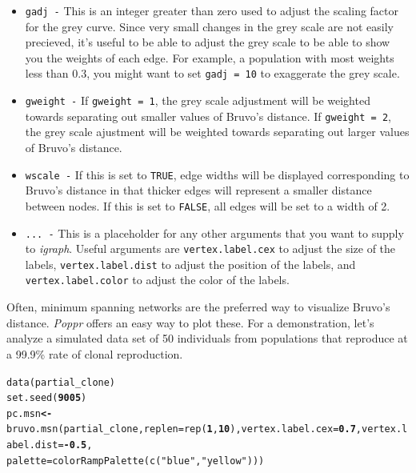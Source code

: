 \documentclass[letterpaper]{article}\usepackage[]{graphicx}\usepackage[]{color}
\makeatletter
\newcommand{\hlnum}[1]{\textcolor[rgb]{0.502,0,0.502}{\textbf{#1}}}%
\newcommand{\hlstr}[1]{\textcolor[rgb]{0.651,0.522,0}{#1}}%
\newcommand{\hlopt}[1]{\textcolor[rgb]{1,0,0.502}{\textbf{#1}}}%
\newcommand{\hlstd}[1]{\textcolor[rgb]{0,0,0}{#1}}%
\newcommand{\hlkwb}[1]{\textcolor[rgb]{0.502,0.502,0.753}{\textbf{#1}}}%
\newcommand{\hlkwc}[1]{\textcolor[rgb]{0,0.502,0.753}{#1}}%
\newcommand{\hlkwd}[1]{\textcolor[rgb]{0,0.267,0.4}{#1}}%
\newenvironment{kframe}{%
 \def\at@end@of@kframe{}%
 \ifinner\ifhmode%
  \def\at@end@of@kframe{\end{minipage}}%
  \begin{minipage}{\columnwidth}%
 \fi\fi%
 \def\FrameCommand##1{\hskip\@totalleftmargin \hskip-\fboxsep
 \colorbox{shadecolor}{##1}\hskip-\fboxsep
     \hskip-\linewidth \hskip-\@totalleftmargin \hskip\columnwidth}%
 \MakeFramed {\advance\hsize-\width
   \@totalleftmargin\z@ \linewidth\hsize
   \@setminipage}}%
 {\par\unskip\endMakeFramed%
 \at@end@of@kframe}
\newenvironment{knitrout}{}{} %
\makeatother
\begin{document}
\begin{itemize}
  \item \texttt{gadj -} This is an integer greater than zero used to adjust the scaling factor for the grey curve. Since very small changes in the grey scale are not easily precieved, it's useful to be able to adjust the grey scale to be able to show you the weights of each edge. For example, a population with most weights less than 0.3, you might want to set \texttt{gadj = 10} to exaggerate the grey scale. 
  \item \texttt{gweight -} If \texttt{gweight = 1}, the grey scale adjustment will be weighted towards separating out smaller values of Bruvo's distance. If \texttt{gweight = 2}, the grey scale ajustment will be weighted towards separating out larger values of Bruvo's distance.
  \item \texttt{wscale -} If this is set to \texttt{TRUE}, edge widths will be displayed corresponding to Bruvo's distance in that thicker edges will represent a smaller distance between nodes. If this is set to \texttt{FALSE}, all edges will be set to a width of 2. 
  \item \texttt{... -} This is a placeholder for any other arguments that you want to supply to \textit{igraph}. Useful arguments are \texttt{vertex.label.cex} to adjust the size of the labels, \texttt{vertex.label.dist} to adjust the position of the labels, and \texttt{vertex.label.color} to adjust the color of the labels.
\end{itemize}

Often, minimum spanning networks are the preferred way to visualize Bruvo's distance. \textit{Poppr} offers an easy way to plot these. For a demonstration, let's analyze a simulated data set of 50 individuals from populations that reproduce at a 99.9\% rate of clonal reproduction.

\begin{knitrout}\footnotesize
{}\color{fgcolor}\begin{kframe}
\begin{alltt}
\hlkwd{data}\hlstd{(partial_clone)}
\hlkwd{set.seed}\hlstd{(}\hlnum{9005}\hlstd{)}
\hlstd{pc.msn} \hlkwb{<-} \hlkwd{bruvo.msn}\hlstd{(partial_clone,} \hlkwc{replen} \hlstd{=} \hlkwd{rep}\hlstd{(}\hlnum{1}\hlstd{,} \hlnum{10}\hlstd{),} \hlkwc{vertex.label.cex} \hlstd{=} \hlnum{0.7}\hlstd{,} \hlkwc{vertex.label.dist} \hlstd{=} \hlopt{-}\hlnum{0.5}\hlstd{,}
    \hlkwc{palette} \hlstd{=} \hlkwd{colorRampPalette}\hlstd{(}\hlkwd{c}\hlstd{(}\hlstr{"blue"}\hlstd{,} \hlstr{"yellow"}\hlstd{)))}
\end{alltt}
\end{kframe}
\end{knitrout}
\end{document}
